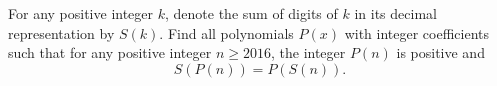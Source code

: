 For any positive integer 
$k$, 
 denote the sum of digits of 
$k$
 in its decimal representation by 
$S(k)$. 
 Find all polynomials 
$P(x)$
 with integer coefficients such that for any positive integer 
$n \geq 2016$, 
 the integer 
$P(n)$
 is positive and 
$$S(P(n)) = P(S(n)).$$